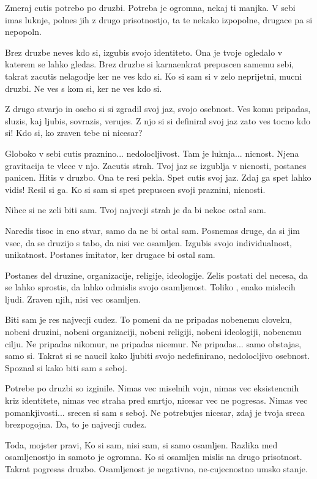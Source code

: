         

   Zmeraj cutis potrebo po druzbi. Potreba je ogromna, nekaj ti manjka. V sebi imas luknje, polnes jih z drugo prisotnostjo, ta te nekako izpopolne, drugace pa si nepopoln. 

Brez druzbe neves kdo si, izgubis svojo identiteto. Ona je tvoje ogledalo v katerem se lahko gledas. Brez druzbe si karnaenkrat prepuscen samemu sebi, takrat zacutis nelagodje ker ne ves kdo si. Ko si sam si v zelo neprijetni, mucni druzbi. Ne ves s kom si, ker ne ves kdo si. 

Z drugo stvarjo in osebo si si zgradil svoj jaz, svojo osebnost. Ves komu pripadas, sluzis, kaj ljubis, sovrazis, verujes. Z njo si si definiral svoj jaz zato ves tocno kdo si! Kdo si, ko zraven tebe ni nicesar? 

Globoko v sebi cutis praznino... nedolocljivost. Tam je luknja... nicnost. Njena gravitacija te vlece v njo. Zacutis strah. Tvoj jaz se izgublja v nicnosti, postanes panicen. Hitis v druzbo. Ona te resi pekla. Spet cutis svoj jaz. Zdaj ga spet lahko vidis! Resil si ga. Ko si sam si spet prepuscen svoji praznini, nicnosti. 

Nihce si ne zeli biti sam. Tvoj najvecji strah je da bi nekoc ostal sam. 

Naredis tisoc in eno stvar, samo da ne bi ostal sam. Posnemas druge, da si jim vsec, da se druzijo s tabo, da nisi vec osamljen. Izgubis svojo individualnost, unikatnost. Postanes imitator, ker drugace bi ostal sam. 

Postanes del druzine, organizacije, religije, ideologije. Zelis postati del necesa, da se lahko sprostis, da lahko odmislis svojo osamljenost. Toliko , enako mislecih ljudi. Zraven njih, nisi vec osamljen. 

Biti sam je res najvecji cudez. To pomeni da ne pripadas nobenemu cloveku, nobeni druzini, nobeni organizaciji, nobeni religiji, nobeni ideologiji, nobenemu cilju. Ne pripadas nikomur, ne pripadas nicemur. Ne pripadas... samo obstajas, samo si. Takrat si se naucil kako ljubiti svojo nedefinirano, nedolocljivo osebnost. Spoznal si kako biti sam s seboj. 

Potrebe po druzbi so izginile. Nimas vec miselnih vojn, nimas vec eksistencnih kriz identitete, nimas vec straha pred smrtjo, nicesar vec ne pogresas. Nimas vec pomankjivosti... srecen si sam s seboj. Ne potrebujes nicesar, zdaj je tvoja sreca brezpogojna. Da, to je najvecji cudez. 

Toda, mojster pravi,  Ko si sam, nisi sam, si samo osamljen. Razlika med osamljenostjo in samoto je ogromna. Ko si osamljen mislis na drugo prisotnost. Takrat pogresas druzbo. Osamljenost je negativno, ne-cujecnostno umsko stanje. 

